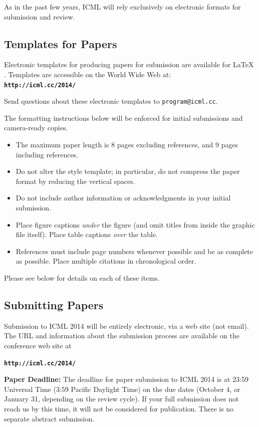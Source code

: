 \documentclass{article}
\begin{document}
As in the past few years, ICML will rely exclusively on
electronic formats for submission and review. 


\subsection{Templates for Papers}

Electronic templates for producing papers for submission are available
for \LaTeX\/ . Templates are accessible on the World
Wide Web at:\\
\textbf{\texttt{http://icml.cc/2014/}}

\noindent
Send questions about these electronic templates to
\texttt{program@icml.cc}.

The formatting instructions below will be enforced for initial submissions and camera-ready copies. 
\begin{itemize}
\item The maximum paper length is 8 pages excluding references, and 
9 pages including references.
\item Do not alter the style template; in particular, do not compress the paper format 
by reducing the vertical spaces.
\item Do not include author information or acknowledgments in your
  initial submission. 
\item Place figure captions {\em under} the figure (and omit titles from
  inside the graphic file itself).  Place table captions {\em over}
  the table.
\item References must include page numbers whenever possible and be as
  complete as possible.  Place multiple citations in chronological order.  
\end{itemize}
Please see below for details on each of these items.

\subsection{Submitting Papers}

Submission to ICML 2014 will be entirely electronic, via a web site
(not email).  The URL and information about the submission process
are available on the conference web site at

\textbf{\texttt{http://icml.cc/2014/}}

{\bf Paper Deadline:} The deadline for paper submission to ICML 2014
is at 23:59 Universal Time (3:59 Pacific Daylight Time) on the due dates
(October 4, or January 31, depending on the review cycle).  
If your full submission does not reach us by this time, it will 
not be considered for publication. There is no separate abstract submission.
\end{document}
